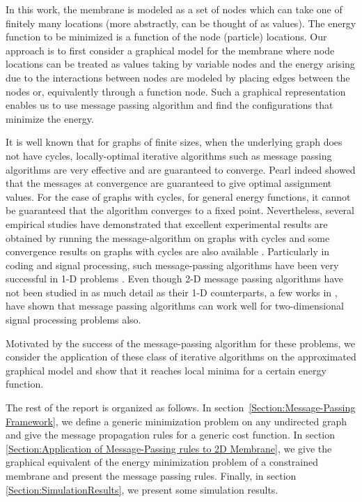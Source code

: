 \documentclass[journal, onecolumn]{IEEEtran}
\begin{document}
In this work, the membrane is modeled as a set of nodes which can take one of finitely many locations (more abstractly, can be thought of as values).  The energy function to be minimized is a function of the node (particle) locations. Our approach is to first consider a graphical model for the membrane where node locations can be treated as values taking by variable nodes and the energy arising due to the interactions between nodes are modeled by placing edges between the nodes or, equivalently through a function node. Such a graphical representation enables us to use message passing algorithm and find the configurations that minimize the energy.

It is well known that for graphs of finite sizes, when the underlying graph does not have cycles, locally-optimal iterative algorithms such as message passing algorithms are very effective and are guaranteed to converge. Pearl \cite{pearl1988probabilistic} indeed showed that the messages at convergence are guaranteed to give optimal assignment values.
For the case of graphs with cycles, for general energy functions, it cannot be guaranteed that the algorithm converges to a fixed point. Nevertheless, several empirical studies have demonstrated that excellent experimental results are obtained by running the message-algorithm on graphs with cycles and some convergence results on graphs with cycles are also available  \cite{weiss2001optimality}. Particularly in coding and signal processing, such message-passing algorithms have been very successful in 1-D problems \cite{kschischang2001factor}. Even though 2-D message passing algorithms have not been studied in as much detail as their 1-D counterparts, a few works in \cite{marrow2003iterative}, \cite{singla2002iterative} have shown that message passing algorithms can work well for two-dimensional signal processing problems also.	

Motivated by the success of the message-passing algorithm for these problems, we consider the application of these class of iterative algorithms on the approximated graphical model and show that it reaches local minima for a certain energy function.

The rest of the report is organized as follows. In section~\ref{Section:Message-Passing Framework}, we define a generic minimization problem on any undirected graph and give the message propagation rules for a generic cost function. In section \ref{Section:Application of Message-Passing rules to 2D Membrane}, we give the graphical equivalent of the energy minimization problem of a constrained membrane and present the message passing rules. Finally, in section \ref{Section:SimulationResults}, we present some simulation results.
\end{document}
